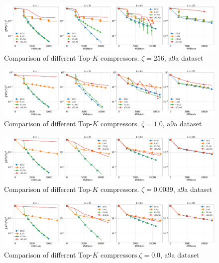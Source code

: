 \documentclass[nohyperref]{article}
\theoremstyle{plain}
\theoremstyle{definition}
\theoremstyle{remark}
\begin{document}
\begin{figure}[!h]
	\centering
	\includegraphics[width=\textwidth]{plots/adaptive/plot_a9a_256.0.pdf}
	\caption{Comparison of different  Top-$K$ compressors. $\zeta = 256$, a9a dataset}
	\label{fig:anna-100-nodes-grads_main}
\end{figure}

\begin{figure}[!h]
	\centering
	\includegraphics[width=\textwidth]{plots/adaptive/plot_a9a_1.0.pdf}
	\caption{Comparison of different  Top-$K$ compressors. $\zeta = 1.0$, a9a dataset}
	\label{fig:anna-100-nodes-grads_main}
\end{figure}

\begin{figure}[!h]
	\centering
	\includegraphics[width=\textwidth]{plots/adaptive/plot_a9a_0.0039.pdf}
	\caption{Comparison of different  Top-$K$ compressors.  $\zeta = 0.0039$, a9a dataset}
	\label{fig:anna-100-nodes-grads_main}
\end{figure}

\begin{figure}[!h]
	\centering
	\includegraphics[width=\textwidth]{plots/adaptive/plot_a9a_0.0.pdf}
	\caption{Comparison of different  Top-$K$ compressors.$\zeta = 0.0$, a9a dataset}
	\label{fig:anna-100-nodes-grads_main}
\end{figure}
\end{document}

